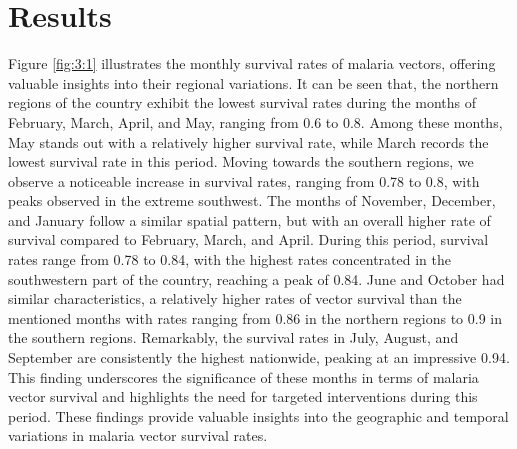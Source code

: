 \documentclass[utf8]{FrontiersinHarvard} %
\begin{document}
\section{Results}
Figure \ref{fig:3:1} illustrates the monthly survival rates of malaria vectors, offering valuable insights into their regional variations. It can be seen that, the northern regions of the country exhibit the lowest survival rates during the months of February, March, April, and May, ranging from 0.6 to 0.8. Among these months, May stands out with a relatively higher survival rate, while March records the lowest survival rate in this period. Moving towards the southern regions, we observe a noticeable increase in survival rates, ranging from 0.78 to 0.8, with peaks observed in the extreme southwest. The months of November, December, and January follow a similar spatial pattern, but with an overall higher rate of survival compared to February, March, and April. During this period, survival rates range from 0.78 to 0.84, with the highest rates concentrated in the southwestern part of the country, reaching a peak of 0.84. June and October had similar characteristics, a relatively higher rates of vector survival than the mentioned months with rates ranging from 0.86 in the northern regions to 0.9 in the southern regions. Remarkably, the survival rates in July, August, and September are consistently the highest nationwide, peaking at an impressive 0.94. This finding underscores the significance of these months in terms of malaria vector survival and highlights the need for targeted interventions during this period. These findings provide valuable insights into the geographic and temporal variations in malaria vector survival rates.
\end{document}
